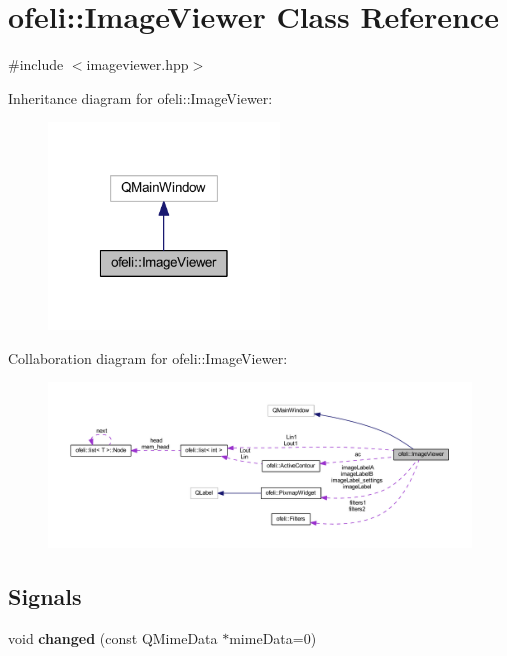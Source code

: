 \hypertarget{classofeli_1_1_image_viewer}{\section{ofeli\-:\-:Image\-Viewer Class Reference}
\label{classofeli_1_1_image_viewer}
}


{\ttfamily \#include $<$imageviewer.\-hpp$>$}



Inheritance diagram for ofeli\-:\-:Image\-Viewer\-:\nopagebreak
\begin{figure}[H]
\begin{center}
\leavevmode
\includegraphics[width=174pt]{classofeli_1_1_image_viewer__inherit__graph}
\end{center}
\end{figure}


Collaboration diagram for ofeli\-:\-:Image\-Viewer\-:\nopagebreak
\begin{figure}[H]
\begin{center}
\leavevmode
\includegraphics[width=350pt]{classofeli_1_1_image_viewer__coll__graph}
\end{center}
\end{figure}
\subsection*{Signals}
\begin{DoxyCompactItemize}
\item 
\hypertarget{classofeli_1_1_image_viewer_a524fa87199b9a93d35a686a4aa508f85}{void {\bfseries changed} (const Q\-Mime\-Data $\ast$mime\-Data=0)}\label{classofeli_1_1_image_viewer_a524fa87199b9a93d35a686a4aa508f85}

\end{DoxyCompactItemize}
